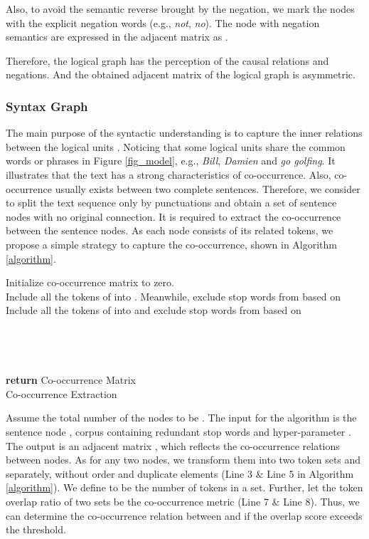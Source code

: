 \documentclass[sigconf]{acmart}
\begin{document}
Also, to avoid the semantic reverse brought by the negation, we mark the nodes with the explicit negation words (e.g., \textit{not}, \textit{no}). The node  with negation semantics are expressed in the adjacent matrix as .

Therefore, the logical graph has the perception of the causal relations and 
negations. And the obtained adjacent matrix  of the logical graph is asymmetric. 

\vspace{-0.25cm}
\subsubsection{\textbf{Syntax Graph}}
The main purpose of the syntactic understanding is to capture the inner relations between the logical units . Noticing that some logical units share the common words or phrases in Figure \ref{fig_model}, e.g., \textit{Bill}, \textit{Damien} and \textit{go golfing}. It illustrates that the text has a strong characteristics of co-occurrence. Also, co-occurrence usually exists between two complete sentences. Therefore, we consider to split the text sequence only by punctuations and obtain a set of sentence nodes with no original connection. It is required to extract the co-occurrence between the sentence nodes. As each node consists of its related tokens, we propose a simple strategy to capture the co-occurrence, shown in Algorithm \ref{algorithm}.

\begin{algorithm}[t]
	Initialize co-occurrence matrix  to zero.  \\
	\For{}
	{
		Include all the tokens of  into . Meanwhile, exclude stop words from  based on  \\
		\For{}
		{
			Include all the tokens of  into  and exclude stop words from  based on  \\
			{
				 \\
				 \\
				\If{}
				{
					 \\
					 \\
				}
			}
		}
	}
	\textbf{return} Co-occurrence Matrix \\
	\caption{Co-occurrence Extraction}
	\label{algorithm}
\end{algorithm}

Assume the total number of the nodes to be . The input for the algorithm is the sentence node , corpus  containing redundant stop words and hyper-parameter . The output is an adjacent matrix , which reflects the co-occurrence relations between nodes. As for any two nodes, we transform them into two token sets and  separately, without order and duplicate elements (Line 3 \& Line 5 in Algorithm \ref{algorithm}). We define  to be the number of tokens in a set. Further, let the token overlap ratio of two sets be the co-occurrence metric (Line 7 \& Line 8). Thus, we can determine the co-occurrence relation between  and  if the overlap score exceeds the threshold.
\end{document}
